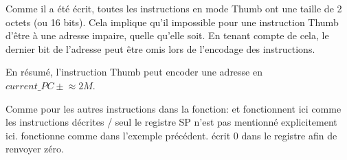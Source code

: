 Comme il a été écrit, toutes les instructions en mode Thumb ont une taille de 2
octets (ou 16 bits).
Cela implique qu'il impossible pour une instruction Thumb d'être à une adresse
impaire, quelle qu'elle soit.
En tenant compte de cela, le dernier bit de l'adresse peut être omis lors de
l'encodage des instructions.

En résumé, l'instruction Thumb  peut encoder une adresse en $current\_PC \pm{}\approx{}2M$.

Comme pour les autres instructions dans la fonction: \PUSH et \POP fonctionnent
ici comme les instructions décrites / seul le
registre \ac{SP} n'est pas mentionné explicitement ici.
 fonctionne comme dans l'exemple précédent.
 écrit 0 dans le registre  afin de renvoyer zéro.


